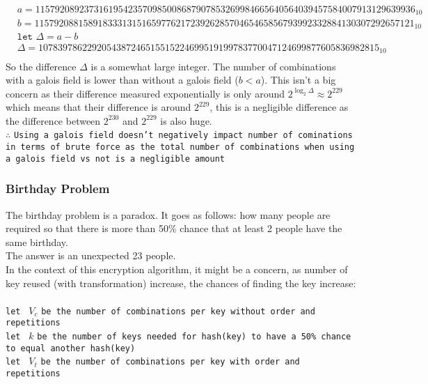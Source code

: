 \documentclass[fleqn, a4paper,12pt]{article}
\begin{document}
\[
\begin{aligned}
&a = 115792089237316195423570985008687907853269984665640564039457584007913129639936_{10} \\
&b = 115792088158918333131516597762172392628570465465856793992332884130307292657121_{10} \\
&\texttt{let  } \Delta = a-b \\
&\Delta = 1078397862292054387246515515224699519199783770047124699877605836982815_{10} \\
\end{aligned}
\]
So the difference $\Delta$ is a somewhat large integer. The number of combinations with a galois field is lower than without a galois field ($b < a$). This isn't a big concern as their difference measured exponentially is only around $2^{\log_2\Delta} \approx 2^{229}$ which means that their difference is around $2^{229}$, this is a negligible difference as the difference between $2^{230}$ and $2^{229}$ is also huge. \\
$\therefore $ \texttt{Using a galois field doesn't negatively impact number of cominations in terms of brute force as the total number of combinations when using a galois field vs not is a negligible amount}

\subsubsection {Birthday Problem} \label{birthday_problem}

The birthday problem is a paradox. It goes as follows: how many people are required so that there is more than 50\% chance that at least 2 people have the same birthday.
\\
The answer is an unexpected 23 people.
\\
In the context of this encryption algorithm, it might be a concern, as number of key reused (with transformation) increase, the chances of finding the key increase:
\\
\\

\texttt{let } $V_c$ \texttt{be the number of combinations per key without order and repetitions} \\
\texttt{let } $k$ \texttt{be the number of keys needed for hash(key) to have a 50\% chance to equal another hash(key)} \\
\texttt{let } $V_t$ \texttt{be the number of combinations per key with order and repetitions} \\
\end{document}
